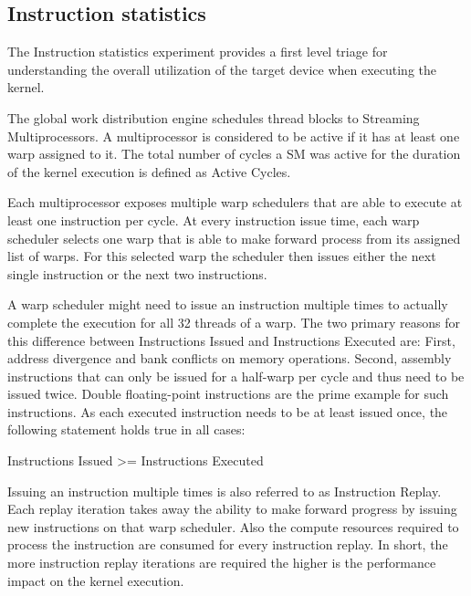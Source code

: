 \documentclass[oneside,openright,12pt,final,en]{mgr}
\begin{document}
\subsection{Instruction statistics}

The Instruction statistics experiment provides a first level triage for understanding the overall utilization of the target device when executing the kernel.

The global work distribution engine schedules thread blocks to Streaming Multiprocessors. A multiprocessor is considered to be active if it has at least one warp assigned to it. The total number of cycles a SM was active for the duration of the kernel execution is defined as Active Cycles.

Each multiprocessor exposes multiple warp schedulers that are able to execute at least one instruction per cycle. At every instruction issue time, each warp scheduler selects one warp that is able to make forward process from its assigned list of warps. For this selected warp the scheduler then issues either the next single instruction or the next two instructions.

A warp scheduler might need to issue an instruction multiple times to actually complete the execution for all 32 threads of a warp. The two primary reasons for this difference between Instructions Issued and Instructions Executed are: First, address divergence and bank conflicts on memory operations. Second, assembly instructions that can only be issued for a half-warp per cycle and thus need to be issued twice. Double floating-point instructions are the prime example for such instructions. As each executed instruction needs to be at least issued once, the following statement holds true in all cases:


\begin{center}
	Instructions Issued >= Instructions Executed
\end{center}


Issuing an instruction multiple times is also referred to as Instruction Replay. Each replay iteration takes away the ability to make forward progress by issuing new instructions on that warp scheduler. Also the compute resources required to process the instruction are consumed for every instruction replay. In short, the more instruction replay iterations are required the higher is the performance impact on the kernel execution.
\end{document}
